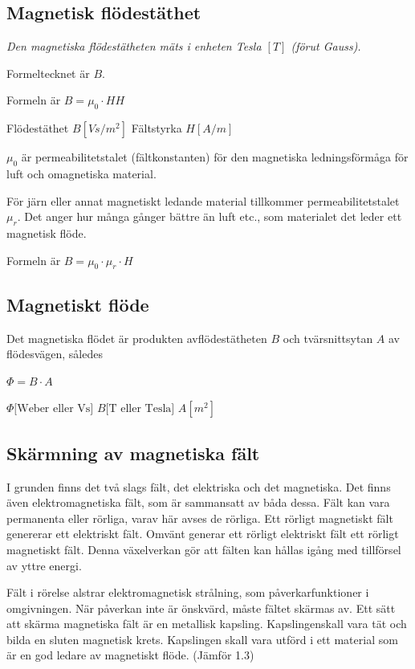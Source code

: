 \subsection{Magnetisk flödestäthet}

\emph{Den magnetiska flödestätheten mäts i enheten Tesla \([T]\) (förut Gauss).}

Formeltecknet är \(B\).

Formeln är \(B = \mu_0 \cdot HH\)

Flödestäthet \(B [Vs/m^2]\) Fältstyrka \(H [A/m]\)

\(\mu_0\) är permeabilitetstalet (fältkonstanten) för den magnetiska ledningsförmåga för
luft och omagnetiska material.

För järn eller annat magnetiskt ledande material tillkommer permeabilitetstalet \(\mu_r\).
Det anger hur många gånger bättre än luft etc., som materialet det leder ett magnetisk
flöde.

Formeln är \(B = \mu_0 \cdot \mu_r \cdot H\)

\subsection{Magnetiskt flöde}

Det magnetiska flödet är produkten avflödestätheten \(B\) och tvärsnittsytan \(A\) av flödesvägen, således

\(\Phi = B \cdot A\)

\(\Phi \text{[Weber eller Vs]}\) \(B \text{[T eller Tesla]}\) \(A [m^2]\)

\subsection{Skärmning av magnetiska fält}

I grunden finns det två slags fält, det elektriska och det magnetiska. Det finns även
elektromagnetiska fält, som är sammansatt av båda dessa. Fält kan vara permanenta eller
rörliga, varav här avses de rörliga. Ett rörligt magnetiskt fält genererar ett elektriskt
fält.
Omvänt generar ett rörligt elektriskt fält ett rörligt magnetiskt fält. Denna växelverkan
gör att fälten kan hållas igång med tillförsel av yttre energi.

Fält i rörelse alstrar elektromagnetisk strålning, som påverkarfunktioner i omgivningen.
När påverkan inte är önskvärd, måste fältet skärmas av. Ett sätt att skärma magnetiska
fält är en metallisk kapsling. Kapslingenskall vara tät och bilda en sluten magnetisk
krets. Kapslingen skall vara utförd i ett material som är en god ledare av magnetiskt
flöde.
(Jämför 1.3)
